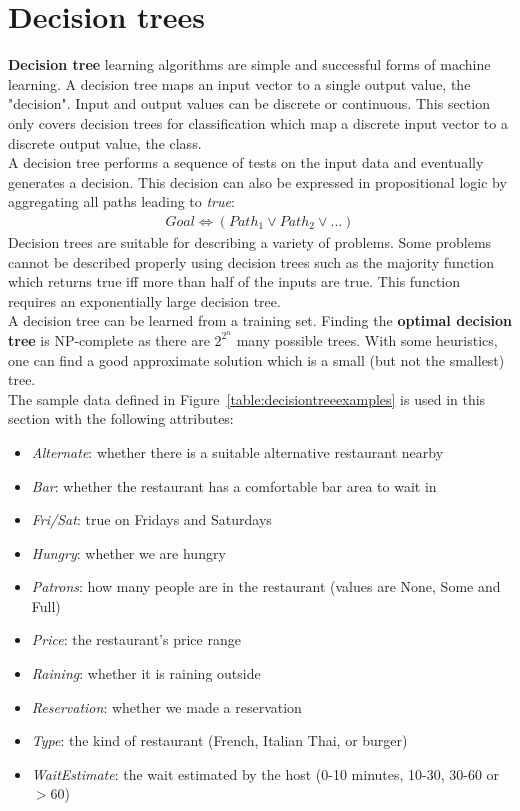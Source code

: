 \documentclass{report}
\begin{document}
\section{Decision trees}
{\bf Decision tree} learning algorithms are simple and successful forms of machine learning. A decision tree maps an input vector to a single output value, the "decision". Input and output values can be discrete or continuous. This section only covers decision trees for classification which map a discrete input vector to a discrete output value, the class. \\
A decision tree performs a sequence of tests on the input data and eventually generates a decision. This decision can also be expressed in propositional logic by aggregating all paths leading to {\em true}:
\begin{align*}
Goal \iff (Path_1 \vee Path_2 \vee ...)
\end{align*}
Decision trees are suitable for describing a variety of problems. Some problems cannot be described properly using decision trees such as the majority function which returns true iff more than half of the inputs are true. This function requires an exponentially large decision tree. \\
A decision tree can be learned from a training set. Finding the {\bf optimal decision tree} is NP-complete as there are $2^{2^n}$ many possible trees. With some heuristics, one can find a good approximate solution which is a small (but not the smallest) tree. \\
The sample data defined in Figure~\ref{table:decisiontreeexamples} is used in this section with the following attributes:
\begin{itemize}
\item {\em Alternate}: whether there is a suitable alternative restaurant nearby
\item {\em Bar}: whether the restaurant has a comfortable bar area to wait in
\item {\em Fri/Sat}: true on Fridays and Saturdays
\item {\em Hungry}: whether we are hungry
\item {\em Patrons}: how many people are in the restaurant (values are None, Some and Full)
\item {\em Price}: the restaurant's price range
\item {\em Raining}: whether it is raining outside
\item {\em Reservation}: whether we made a reservation
\item {\em Type}: the kind of restaurant (French, Italian Thai, or burger)
\item {\em WaitEstimate}: the wait estimated by the host (0-10 minutes, 10-30, 30-60 or $>$60)
\end{itemize}
\end{document}
